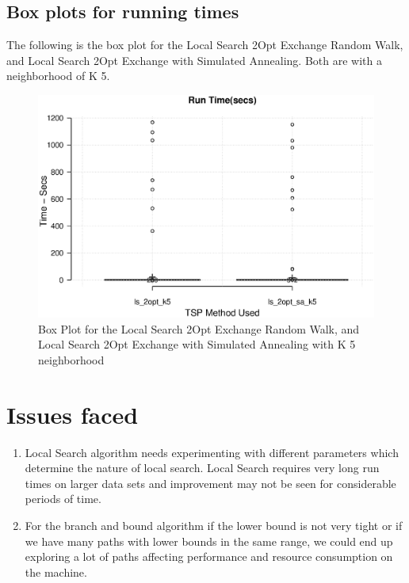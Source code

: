 \documentclass[twoside,11pt]{article}
\begin{document}
\subsection{Box plots for running times}
The following is the box plot for the Local Search 2Opt Exchange Random Walk, and  Local Search 2Opt Exchange with Simulated Annealing. Both are with a neighborhood of K 5.
\begin{figure}[!htbp]
\centering
\caption{Box Plot for the Local Search 2Opt Exchange Random Walk, and  Local Search 2Opt Exchange with Simulated Annealing with K 5 neighborhood}
\includegraphics[scale=.7]{images/boxplot}
\end{figure}
 
\section{Issues faced}
\begin{enumerate}
\item
Local Search algorithm needs experimenting with different parameters which determine the nature of local search. Local Search requires very long run times on larger data sets and improvement may not be seen for considerable periods of time. 
\item
For the branch and bound algorithm if the lower bound is not very tight or if we have many paths with lower bounds in the same range, we could end up exploring a lot of paths affecting performance and resource consumption on the machine.
\end{enumerate}
\end{document}

